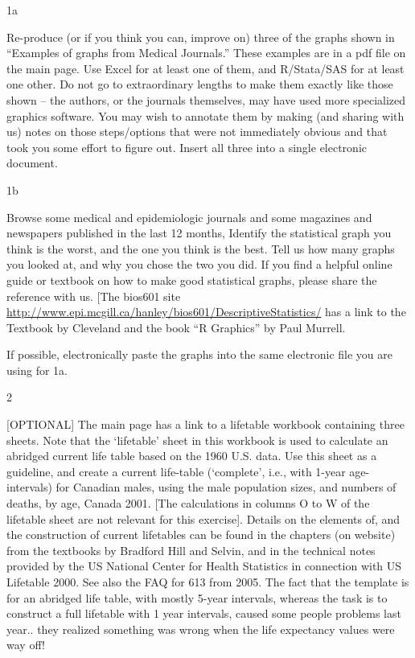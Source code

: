\documentclass[]{book}
\begin{document}
1a

Re-produce (or if you think you can, improve on) three of the graphs shown in ``Examples of graphs from Medical Journals.'' These examples are in a pdf file on the main page. Use Excel for at least one of them, and R/Stata/SAS for at least one other. Do not go to extraordinary lengths to make them exactly like those shown -- the authors, or the journals themselves, may have used more specialized graphics software. You may wish to annotate them by making (and sharing with us) notes on those steps/options that were not immediately obvious and that took you some effort to figure out. Insert all three into a single electronic document.

1b

Browse some medical and epidemiologic journals and some magazines and newspapers published in the last 12 months, Identify the statistical graph you think is the worst, and the one you think is the best. Tell us how many graphs you looked at, and why you chose the two you did. If you find a helpful online guide or textbook on how to make good statistical graphs, please share the reference with us. {[}The bios601 site
\url{http://www.epi.mcgill.ca/hanley/bios601/DescriptiveStatistics/} has a link to the Textbook by Cleveland and the book ``R Graphics'' by Paul Murrell.

If possible, electronically paste the graphs into the same electronic file you are using for 1a.

2

{[}OPTIONAL{]} The main page has a link to a lifetable workbook containing three sheets. Note that the `lifetable' sheet in this workbook is used to calculate an abridged current life table based on the 1960 U.S. data. Use this sheet as a guideline, and create a current life-table (`complete', i.e., with 1-year age-intervals) for Canadian males, using the male population sizes, and numbers of deaths, by age, Canada 2001. {[}The calculations in columns O to W of the lifetable sheet are not relevant for this exercise{]}. Details on the elements of, and the construction of current lifetables can be found in the chapters (on website) from the textbooks by Bradford Hill and Selvin, and in the technical notes provided by the US National Center for Health Statistics in connection with US Lifetable 2000. See also the FAQ for 613 from 2005. The fact that the template is for an abridged life table, with mostly 5-year intervals, whereas the task is to construct a full lifetable with 1 year intervals, caused some people problems last year.. they realized something was wrong when the life expectancy values were way off!
\end{document}
